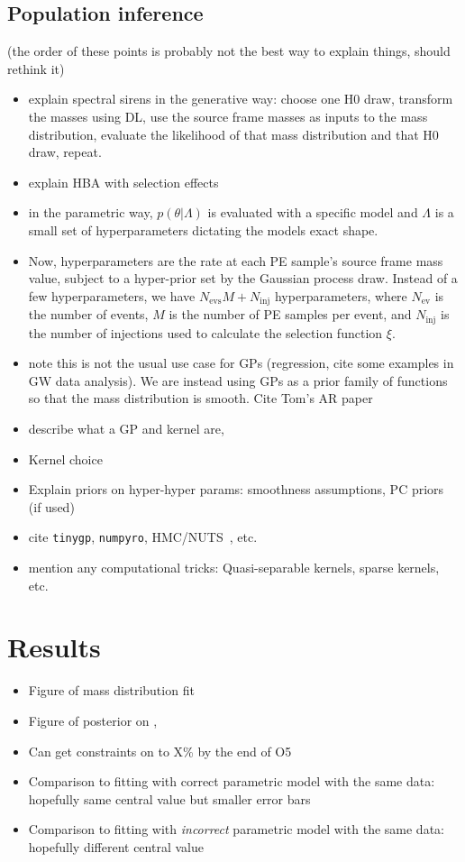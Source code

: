 \documentclass[]{aastex631}
\begin{document}
\subsection{Population inference}
(the order of these points is probably not the best way to explain things, should rethink it)
\begin{itemize}
    \item explain spectral sirens in the generative way: choose one H0 draw, transform the masses using DL, use the source frame masses as inputs to the mass distribution, evaluate the likelihood of that mass distribution and that H0 draw, repeat.
    \item explain HBA with selection effects
    \item in the parametric way, $p(\theta|\Lambda)$ is evaluated with a specific model and $\Lambda$ is a small set of hyperparameters dictating the models exact shape. 
    \item Now, hyperparameters are the rate at each PE sample's source frame mass value, subject to a hyper-prior set by the Gaussian process draw. Instead of a few hyperparameters, we have $N_{\text{evs}}M + N_{\text{inj}}$ hyperparameters, where $N_{\text{ev}}$ is the number of events, $M$ is the number of PE samples per event, and $N_{\text{inj}}$ is the number of injections used to calculate the selection function $\xi$.
    \item note this is not the usual use case for GPs (regression, cite some examples in GW data analysis). We are instead using GPs as a prior family of functions so that the mass distribution is smooth. Cite Tom's AR paper
    \item describe what a GP and kernel are, \citep{rasmussen_gaussian_2006}
    \item Kernel choice
    \item Explain priors on hyper-hyper params: smoothness assumptions, PC priors~\citep{simpson_penalising_2017} (if used)
    \item cite \texttt{tinygp}, \texttt{numpyro}, HMC/NUTS~\citep{hoffman_no-u-turn_2011}, etc.
    \item mention any computational tricks: Quasi-separable kernels, sparse kernels, etc.
\end{itemize}
\section{Results}
\label{sec:results}
\begin{itemize}
    \item Figure of mass distribution fit
    \item Figure of posterior on \Ho, \Omm
    \item Can get constraints on \Ho to X\% by the end of O5
    \item Comparison to fitting with correct parametric model with the same data: hopefully same central value but smaller error bars
    \item Comparison to fitting with \emph{incorrect} parametric model with the same data: hopefully different central value    
\end{itemize}
\end{document}
